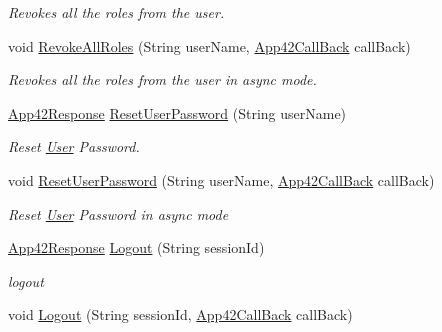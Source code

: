 \begin{DoxyCompactItemize}
\begin{DoxyCompactList}\small\item\em Revokes all the roles from the user. \end{DoxyCompactList}\item 
void \hyperlink{classcom_1_1shephertz_1_1app42_1_1paas_1_1sdk_1_1csharp_1_1user_1_1_user_service_aabf90edca9432fb5e3f40e793aa505cc}{Revoke\+All\+Roles} (String user\+Name, \hyperlink{interfacecom_1_1shephertz_1_1app42_1_1paas_1_1sdk_1_1csharp_1_1_app42_call_back}{App42\+Call\+Back} call\+Back)
\begin{DoxyCompactList}\small\item\em Revokes all the roles from the user in async mode. \end{DoxyCompactList}\item 
\hyperlink{classcom_1_1shephertz_1_1app42_1_1paas_1_1sdk_1_1csharp_1_1_app42_response}{App42\+Response} \hyperlink{classcom_1_1shephertz_1_1app42_1_1paas_1_1sdk_1_1csharp_1_1user_1_1_user_service_af8fb046750377cca896637a4b9c542a8}{Reset\+User\+Password} (String user\+Name)
\begin{DoxyCompactList}\small\item\em Reset \hyperlink{classcom_1_1shephertz_1_1app42_1_1paas_1_1sdk_1_1csharp_1_1user_1_1_user}{User} Password. \end{DoxyCompactList}\item 
void \hyperlink{classcom_1_1shephertz_1_1app42_1_1paas_1_1sdk_1_1csharp_1_1user_1_1_user_service_a68ea210e63efa2d35b36b6e3e49bfcf1}{Reset\+User\+Password} (String user\+Name, \hyperlink{interfacecom_1_1shephertz_1_1app42_1_1paas_1_1sdk_1_1csharp_1_1_app42_call_back}{App42\+Call\+Back} call\+Back)
\begin{DoxyCompactList}\small\item\em Reset \hyperlink{classcom_1_1shephertz_1_1app42_1_1paas_1_1sdk_1_1csharp_1_1user_1_1_user}{User} Password in async mode \end{DoxyCompactList}\item 
\hyperlink{classcom_1_1shephertz_1_1app42_1_1paas_1_1sdk_1_1csharp_1_1_app42_response}{App42\+Response} \hyperlink{classcom_1_1shephertz_1_1app42_1_1paas_1_1sdk_1_1csharp_1_1user_1_1_user_service_a5a3210da9d0c718035ab0c7833fab0c1}{Logout} (String session\+Id)
\begin{DoxyCompactList}\small\item\em logout \end{DoxyCompactList}\item 
void \hyperlink{classcom_1_1shephertz_1_1app42_1_1paas_1_1sdk_1_1csharp_1_1user_1_1_user_service_a38d3bf67dd814cb12d52d7bfc81be5ce}{Logout} (String session\+Id, \hyperlink{interfacecom_1_1shephertz_1_1app42_1_1paas_1_1sdk_1_1csharp_1_1_app42_call_back}{App42\+Call\+Back} call\+Back)

\end{DoxyCompactItemize}
